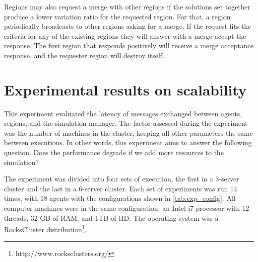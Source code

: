\documentclass[preprint,12pt]{elsarticle}
\begin{document}
Regions may also request a merge with other regions if the solutions set together produce a lower variation ratio for the requested region. For that, a region periodically broadcasts to other regions asking for a merge. If the request fits the criteria for any of the existing regions they will answer with a merge accept the response. The first region that responds positively will receive a merge acceptance response, and the requester region will destroy itself. 

\section{Experimental results on scalability}
\label{sec:experiment}
This experiment evaluated the latency of messages exchanged between agents, regions, and the simulation manager. The factor assessed during the experiment was the number of machines in the cluster, keeping all other parameters the same between executions. In other words, this experiment aims to answer the following question. Does the performance degrade if we add more resources to the simulation?

The experiment was divided into four sets of execution, the first in a 3-server cluster and the last in a 6-server cluster. Each set of experiments was run 14 times, with 18 agents with the configurations shown in \autoref{tab:exp_config}. All computer machines were in the same configuration: an Intel i7 processor with 12 threads, 32 GB of RAM, and 1TB of HD. The operating system was a RocksCluster distribution\footnote{http://www.rocksclusters.org/}. 
\end{document}
